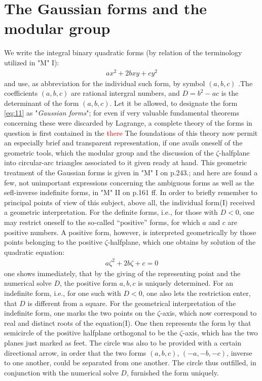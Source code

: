 \section{The Gaussian forms and the modular group}
We write the integral binary quadratic forms (by relation of the terminology utilized in "M" I):
\begin{align}\label{eq:11} %
ax^2+2bxy+cy^2
\end{align}
and use, as abbreviation for the individual such form, by symbol $(a,b,c)$ .The coefficients $(a,b,c)$ are rational intergral numbers, and $D=b^{2}-ac$ is the determinant of the form $(a,b,c)$. Let it be allowed, to designate the form \ref{eq:11}  as "\textit{Gaussian forms}"; for even if very valuable fundamental theorems concerning these were discarded by Lagrange, a complete theory of the forms in question is first contained in the \textcolor{red}{there}
The foundations of this theory now permit an especially brief and transparent representation, if one avails oneself of the geometric tools, which the modular group and the discussion of the $\zeta$-halfplane into circular-arc triangles associated to it given ready at hand. This geometric treatment of the Gaussian forms is given in "M" I on p.243.; and here are found a few, not unimportant expressions concerning the ambiguous forms as well as the sefl-inverse indefinite forms, in "M" II on p.161 ff.
In order to briefly remember to principal points of view of this subject, above all, the individual form(I) received a geometric interpretation.
For the definite forms, i.e., for those with $D<0$, one may restrict oneself to the so-called “positive” forms, for which $a$ and $c$ are positive numbers. A positive form, however, is interpreted geometrically by those points belonging to the positive $\zeta$-halfplane, which one obtains by solution of the quadratic equation:
\begin{align}\label{eq:12}
a\zeta^2+2b\zeta+c=0
\end{align}
one shows immediately, that by the giving of the representing point and the numerical solve $D$, the positive form $a,b,c$ is uniquely determined.
For an indefinite form, i.e., for one such with $D<0$, one also lets the restriction enter, that $D$ is different from a square. For the geometrical interpretation of the indefinite form, one marks the two points on the $\zeta$-axis, which now correspond to real and distinct roots of the equation(I). One then represents the form by that semicircle of the positive halfplane orthogonal to be the $\zeta$-axis, which has the two planes just marked as feet. The circle was also to be provided with a certain directional arrow, in order that the two forms $(a,b,c)$, $(-a,-b,-c)$, inverse to one another, could be separated from one another. The circle thus outfilled, in conjunction with the numerical solve $D$, furnished the form uniquely.
